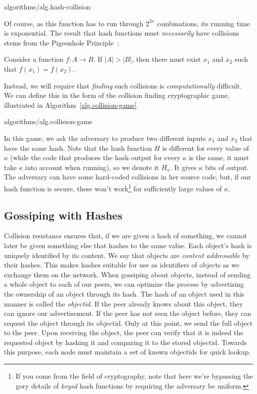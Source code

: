 {algorithms/alg.hash-collision}

Of course, as this function has to run through
$2^{2\kappa}$ combinations, its running time is exponential. The result that hash
functions must \emph{necessarily} have collisions stems from the Pigeonhole
Principle~\cite{liu}:

\begin{theorem}[Pigeonhole]
  Consider a function $f: A \longrightarrow B$. If $|A| > |B|$, then there must
  exist $x_1$ and $x_2$ such that $f(x_1) = f(x_2)$.
\end{theorem}

Instead, we will require that \emph{finding} such collisions is \emph{computationally}
difficult. We can define this in the form of the collision finding cryptographic game,
illustrated in Algorithm~\ref{alg.collision-game}.

{algorithms/alg.collision-game}

In this game, we ask the adversary to produce two different inputs $x_1$ and $x_2$
that have the same hash. Note that the hash function $H$ is different
for every value of $\kappa$ (while the code that produces the hash output for every
$\kappa$ is the same, it must take $\kappa$ into account when running), so we
denote it $H_\kappa$. It gives $\kappa$ bits of output. The adversary can have some
hard-coded collisions in her source code, but, if our hash function is secure, these won't
work\footnote{If you come from the field of cryptography,
note that here we're bypassing the gory details of \emph{keyed} hash functions
by requiring the adversary be uniform.}
for sufficiently large values of $\kappa$.

\subsection*{Gossiping with Hashes}

Collision resistance ensures that, if we are given a hash of something, we cannot
later be given something else that hashes to the same value. Each object's hash
is uniquely identified by its content. We say that objects are
\emph{content addressable}
by their hashes.
This makes hashes suitable
for use as identifiers of objects as we exchange them on the network. When gossiping
about objects, instead of sending a whole object to each of our peers, we can optimize
the process by advertising the ownership of an object through its hash. The hash of
an object used in this manner is called the \emph{objectid}. If the peer already knows
about this object, they can ignore our advertisement. If the peer has not seen the
object before, they can request the object through its objectid. Only at this point, we
send the full object to the peer. Upon receiving the object, the peer can verify that
it is indeed the requested object by hashing it and comparing it to the stored objectid.
Towards this purpose, each node must maintain a set of known objectids for quick lookup.

